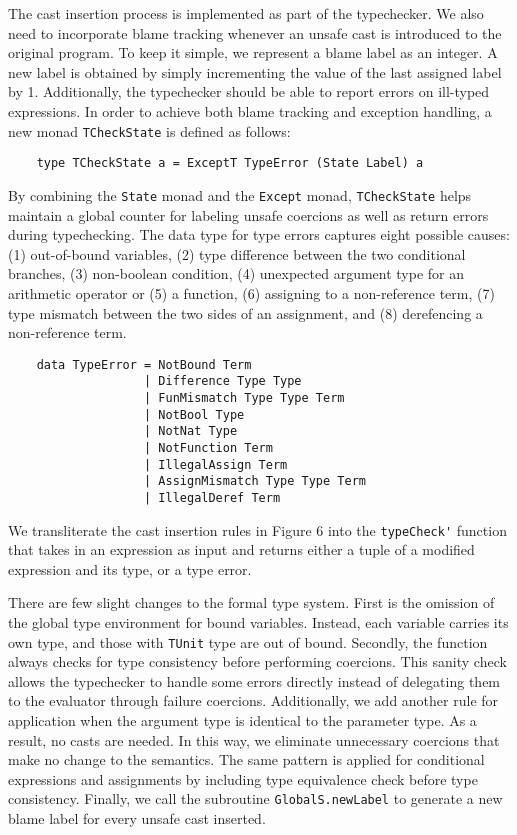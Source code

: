 The cast insertion process is implemented as part of the typechecker. 
We also need to incorporate blame tracking whenever an unsafe cast 
is introduced to the original program. To keep it simple, we 
represent a blame label as an integer. A new label is obtained 
by simply incrementing the value of the last assigned label by 1. 
Additionally, the typechecker should be able to report errors on 
ill-typed expressions. In order to achieve both blame tracking 
and exception handling, a new monad \lstinline{TCheckState} is defined 
as follows:
\begin{lstlisting} 
    type TCheckState a = ExceptT TypeError (State Label) a
\end{lstlisting}
By combining the \lstinline{State} monad and the \lstinline{Except} monad, \lstinline{TCheckState} 
helps maintain a global counter for labeling unsafe coercions 
as well as return errors during typechecking. The data type 
for type errors captures eight possible causes: (1) out-of-bound variables, 
(2) type difference between the two conditional branches, (3) non-boolean condition, 
(4) unexpected argument type for an arithmetic operator or (5) a function, 
(6) assigning to a non-reference term, 
(7) type mismatch between the two sides of an assignment, and (8) derefencing a 
non-reference term. 

\begin{lstlisting}
    data TypeError = NotBound Term                 
                   | Difference Type Type          
                   | FunMismatch Type Type Term    
                   | NotBool Type                  
                   | NotNat Type                   
                   | NotFunction Term               
                   | IllegalAssign Term            
                   | AssignMismatch Type Type Term  
                   | IllegalDeref Term   
\end{lstlisting}

We transliterate the cast insertion rules in Figure 6 
into the \lstinline{typeCheck'} function that takes in an expression as input 
and returns either a tuple of a modified expression and its type, 
or a type error.



There are few slight changes to the formal type system. First is the 
omission of the global type environment for bound variables. Instead, each 
variable carries its own type, and those with \lstinline{TUnit} type are 
out of bound. Secondly, the function always checks for type 
consistency before performing coercions. This sanity check allows the 
typechecker to handle some errors directly instead of delegating them 
to the evaluator through failure coercions. 
Additionally, we add another rule for application when the 
argument type is identical to the parameter type. As a result, no casts 
are needed. In this way, we eliminate unnecessary coercions that make 
no change to the semantics. The same pattern is applied for conditional 
expressions and assignments by including type equivalence check before 
type consistency. Finally, we call the subroutine \lstinline{GlobalS.newLabel} 
to generate a new blame label for every unsafe cast inserted. 

